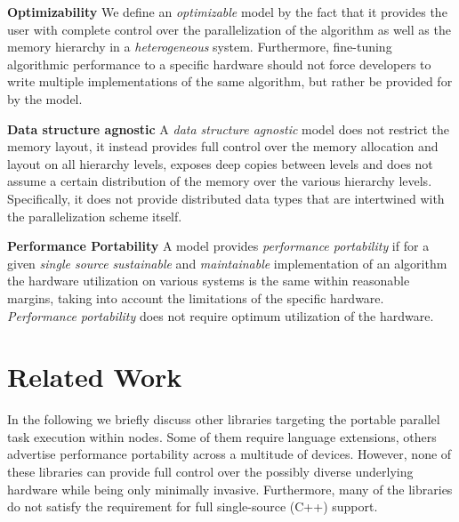 \documentclass[10pt, twocolumn]{article}
\begin{document}
\textbf{Optimizability} We define an \emph{optimizable} model by the fact that it provides the user with complete control over the parallelization of the algorithm as well as the memory hierarchy in a \emph{heterogeneous} system. Furthermore, fine-tuning algorithmic performance to a specific hardware should not force developers to write multiple implementations of the same algorithm, but rather be provided for by the model.

\textbf{Data structure agnostic} A \emph{data structure agnostic} model does not restrict the memory layout, it instead provides full control over the memory allocation and layout on all hierarchy levels, exposes deep copies between levels and does not assume a certain distribution of the memory over the various hierarchy levels. Specifically, it does not provide distributed data types that are intertwined with the parallelization scheme itself.

\textbf{Performance Portability} A model provides \emph{performance portability} if for a given \emph{single source} \emph{sustainable} and \emph{maintainable} implementation of an algorithm the hardware utilization on various systems is the same within reasonable margins, taking into account the limitations of the specific hardware. \emph{Performance portability} does not require optimum utilization of the hardware.

































 \section{Related Work}

In the following we briefly discuss other libraries targeting the portable parallel task execution within nodes.
Some of them require language extensions, others advertise performance portability across a multitude of devices.
However, none of these libraries can provide full control over the possibly diverse underlying hardware while being only minimally invasive.
Furthermore, many of the libraries do not satisfy the requirement for full single-source (C++) support.
\end{document}
